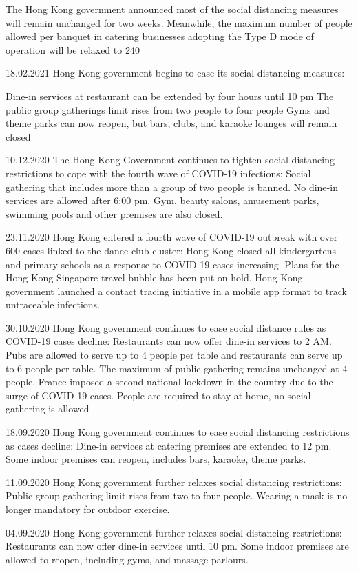 The Hong Kong government announced most of the social distancing measures will remain unchanged for two weeks. Meanwhile, the maximum number of people allowed per banquet in catering businesses adopting the Type D mode of operation will be relaxed to 240

18.02.2021 Hong Kong government begins to ease its social distancing measures:

Dine-in services at restaurant can be extended by four hours until 10 pm
The public group gatherings limit rises from two people to four people
Gyms and theme parks can now reopen, but bars, clubs, and karaoke lounges will remain closed

10.12.2020 The Hong Kong Government continues to tighten social distancing restrictions to cope with the fourth wave of COVID-19 infections:
Social gathering that includes more than a group of two people is banned.
No dine-in services are allowed after 6:00 pm.
Gym, beauty salons, amusement parks, swimming pools and other premises are also closed.

23.11.2020 Hong Kong entered a fourth wave of COVID-19 outbreak with over 600 cases linked to the dance club cluster:
Hong Kong closed all kindergartens and primary schools as a response to COVID-19 cases increasing.
Plans for the Hong Kong-Singapore travel bubble has been put on hold.
Hong Kong government launched a contact tracing initiative in a mobile app format to track untraceable infections.

30.10.2020 Hong Kong government continues to ease social distance rules as COVID-19 cases decline:
Restaurants can now offer dine-in services to 2 AM.
Pubs are allowed to serve up to 4 people per table and restaurants can serve up to 6 people per table.
The maximum of public gathering remains unchanged at 4 people.
France imposed a second national lockdown in the country due to the surge of COVID-19 cases. People are required to stay at home, no social gathering is allowed

18.09.2020 Hong Kong government continues to ease social distancing restrictions as cases decline:
Dine-in services at catering premises are extended to 12 pm.
Some indoor premises can reopen, includes bars, karaoke, theme parks.

11.09.2020 Hong Kong government further relaxes social distancing restrictions:
Public group gathering limit rises from two to four people.
Wearing a mask is no longer mandatory for outdoor exercise.

04.09.2020 Hong Kong government further relaxes social distancing restrictions:
Restaurants can now offer dine-in services until 10 pm.
Some indoor premises are allowed to reopen, including gyms, and massage parlours.

